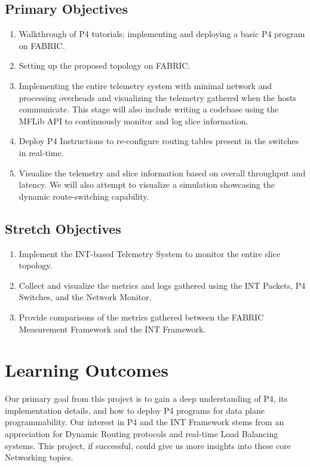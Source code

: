 \documentclass[conference]{IEEEtran}
\begin{document}
\subsection{Primary Objectives}
\begin{enumerate}
\item Walkthrough of P4 tutorials; implementing and deploying a basic P4 program on FABRIC.
\item Setting up the proposed topology on FABRIC. 
\item Implementing the entire telemetry system with minimal network and processing overheads and visualizing the telemetry gathered when the hosts communicate. This stage will also include writing a codebase using the MFLib API to continuously monitor and log slice information.
\item Deploy P4 Instructions to re-configure routing tables present in the switches in real-time.
\item Visualize the telemetry and slice information based on overall throughput and latency. We will also attempt to visualize a simulation showcasing the dynamic route-switching capability.
\end{enumerate}
\subsection{Stretch Objectives}
\begin{enumerate}
\item Implement the INT-based Telemetry System to monitor the entire slice topology.
\item Collect and visualize the metrics and logs gathered using the INT Packets, P4 Switches, and the Network Monitor.
\item Provide comparisons of the metrics gathered between the FABRIC Measurement Framework and the INT Framework. 
\end{enumerate}

\section{Learning Outcomes}
Our primary goal from this project is to gain a deep understanding of P4, its implementation details, and how to deploy P4 programs for data plane programmability. Our interest in P4 and the INT Framework stems from an appreciation for Dynamic Routing protocols and real-time Load Balancing systems. This project, if successful, could give us more insights into these core Networking topics.
\end{document}
